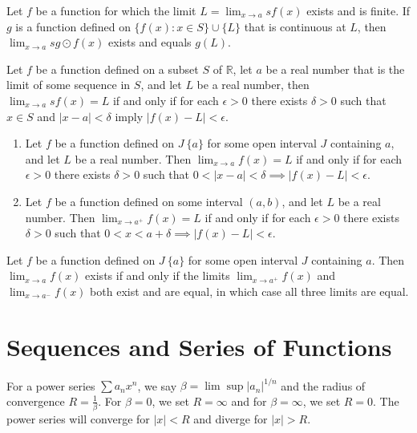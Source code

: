 \begin{theo}{1}
	Let $f$ be a function for which the limit $L = \lim_{x\rightarrow a} s f(x)$ exists and
	is finite. If $g$ is a function defined on $\{f(x) : x \in S\} \cup \{L\}$ that is
	continuous at $L$, then $\lim_{x\rightarrow a} s g \odot f(x)$ exists and equals $g(L)$.
\end{theo}

\begin{theo}{1}
	Let $f$ be a function defined on a subset $S$ of $\mathbb{R}$, let $a$ be a real number that is the limit of some sequence in $S$, and let $L$ be a real number, then $\lim_{x\rightarrow a} s f(x) = L$ if and only if	for each $\epsilon > 0$ there exists $\delta > 0$ such that $x \in S$ and $|x - a| < \delta$ imply $|f(x) - L| < \epsilon$.
	\begin{enumerate}
		\item Let $f$ be a function defined on $J \ \{a\}$ for some open interval $J$ containing $a$, and let $L$ be a real number. Then $\lim_{x\rightarrow a} f(x) = L$ if and only if for each $\epsilon > 0$ there exists $\delta > 0$ such that $0 < |x - a| < \delta \implies |f(x) - L| < \epsilon$.
		\item Let $f$ be a function defined on some interval $(a, b)$, and let $L$ be a	real number. Then $\lim_{x\rightarrow a^+}  f(x) = L$ if and only if	for each $\epsilon > 0$ there exists $\delta > 0$ such that $0 < x < a + \delta \implies |f(x) - L| < \epsilon$.
	\end{enumerate}
\end{theo}

\begin{theo}{1}
	Let $f$ be a function defined on $J \ \{a\}$ for some open interval $J$ containing $a$. Then $\lim_{x\rightarrow a} f(x)$ exists if and only if the limits $\lim_{x\rightarrow a^+} f(x)$ and $\lim_{x\rightarrow a^-} f(x)$ both exist and are equal, in which case all three limits are equal.
\end{theo}

\section{Sequences and Series of Functions}

\begin{theo}{1}
	For a power series $\sum a_n x^n$, we say $\beta = \lim \sup |a_n|^{1/n}$ and the radius of convergence $R=\frac{1}{\beta}$. For $\beta = 0$, we set $R=\infty$ and for $\beta = \infty$, we set $R=0$. The power series will converge for $|x| < R$ and diverge for $|x| > R$.
\end{theo}


